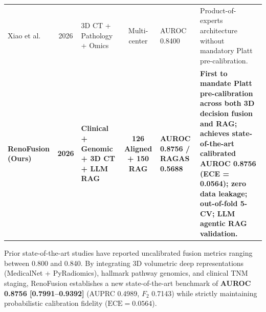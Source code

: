 \begin{table}[t]
\begin{tabularx}{\textwidth}{@{} >{\raggedright\arraybackslash}p{} c >{\raggedright\arraybackslash}p{} c >{\centering\arraybackslash}p{} L @{}}
Xiao et al. \cite{xiao2026urofusion} & 2026 & 3D CT + Pathology + Omics & Multi-center & AUROC 0.8400 & Product-of-experts architecture without mandatory Platt pre-calibration. \\ \addlinespace[2pt]
\textbf{RenoFusion (Ours)} & \textbf{2026} & \textbf{Clinical + Genomic + 3D CT + LLM RAG} & \textbf{126 Aligned + 150 RAG} & \textbf{AUROC 0.8756 / RAGAS 0.5688} & \textbf{First to mandate Platt pre-calibration across both 3D decision fusion and RAG; achieves state-of-the-art calibrated AUROC 0.8756 (ECE = 0.0564); zero data leakage; out-of-fold 5-CV; LLM agentic RAG validation.} \\
\bottomrule
\end{tabularx}
\end{table}

Prior state-of-the-art studies \cite{schulz2021multimodal, mahootiha2023multimodal, yang2024multimodal, zang2025multimodal, xiao2026urofusion} have reported uncalibrated fusion metrics ranging between 0.800 and 0.840. By integrating 3D volumetric deep representations (MedicalNet + PyRadiomics), hallmark pathway genomics, and clinical TNM staging, RenoFusion establishes a new state-of-the-art benchmark of \textbf{AUROC 0.8756 [0.7991--0.9392]} (AUPRC 0.4989, $F_2$ 0.7143) while strictly maintaining probabilistic calibration fidelity ($\text{ECE} = 0.0564$).

